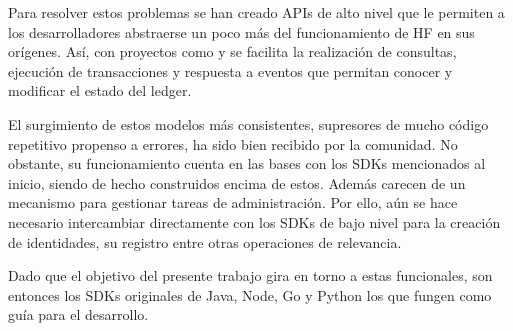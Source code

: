 Para resolver estos problemas se han creado APIs de alto nivel que le permiten a los desarrolladores abstraerse un poco m\'as del funcionamiento de HF en sus or\'igenes. As\'i, con proyectos como \cite{FabricGatewayJava} y \cite{FabricGatewayGeneral} se facilita la realizaci\'on de consultas, ejecuci\'on de transacciones y respuesta a eventos que permitan conocer y modificar el estado del ledger.

El surgimiento de estos modelos m\'as consistentes, supresores de mucho c\'odigo repetitivo propenso a errores, ha sido bien recibido por la comunidad. No obstante, su funcionamiento cuenta en las bases con los SDKs mencionados al inicio, siendo de hecho construidos encima de estos. Adem\'as carecen de un mecanismo para gestionar tareas de administraci\'on. Por ello, a\'un se hace necesario intercambiar directamente con los SDKs de bajo nivel para la creaci\'on de identidades, su registro entre otras operaciones de relevancia.

Dado que el objetivo del presente trabajo gira en torno a estas funcionales, son entonces los SDKs originales de Java, Node, Go y Python los que fungen como gu\'ia para el desarrollo.
